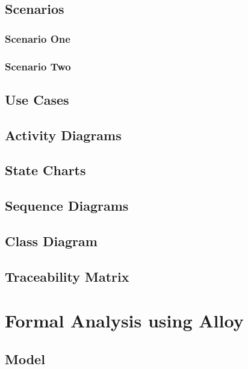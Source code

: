 \documentclass{article}
\begin{document}
\subsection{Scenarios}

\subsubsection{Scenario One}


\clearpage
\subsubsection{Scenario Two}


\clearpage
\subsection{Use Cases}



\clearpage
\subsection{Activity Diagrams}


\clearpage
\subsection{State Charts}


\clearpage
\subsection{Sequence Diagrams}


\clearpage
\subsection{Class Diagram}


\clearpage
\subsection{Traceability Matrix}


\clearpage
\section{Formal Analysis using Alloy}
\subsection{Model}
\end{document}
